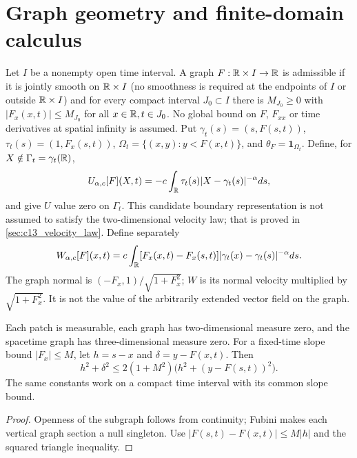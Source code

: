 \section{Graph geometry and finite-domain calculus}

\begin{definition}
  \label{def:c13_graph_data}
  Let $I$ be a nonempty open time interval. A graph $F:\mathbb{R}\times I\to\mathbb{R}$ is admissible if
  it is jointly smooth on $\mathbb{R}\times I$ (no smoothness is required at the endpoints of $I$ or outside $\mathbb{R}\times I$)
  and for every compact interval $J_0\subset I$ there is $M_{J_0}\ge0$
  with $|F_x(x,t)|\le M_{J_0}$ for all $x\in\mathbb{R},t\in J_0$.
  No global bound on $F$, $F_{xx}$ or time derivatives at spatial infinity is assumed.
  Put $\gamma_t(s)=(s,F(s,t))$, $\tau_t(s)=(1,F_x(s,t))$,
  $\Omega_t=\{(x,y):y<F(x,t)\}$, and $\theta_F=\mathbf1_{\Omega_t}$.
  Define, for $X\notin\Gamma_t=\gamma_t(\mathbb{R})$,
  \[
    U_{\alpha,c}[F](X,t)=-c\int_{\mathbb{R}}\tau_t(s)|X-\gamma_t(s)|^{-\alpha}ds,
  \]
  and give $U$ value zero on $\Gamma_t$. This candidate boundary representation is not assumed
  to satisfy the two-dimensional velocity law; that is proved in \cref{sec:c13_velocity_law}.
  Define separately
  \[
    W_{\alpha,c}[F](x,t)=c\int_{\mathbb{R}}
       [F_x(x,t)-F_x(s,t)]|\gamma_t(x)-\gamma_t(s)|^{-\alpha}ds.
  \]
  The graph normal is $(-F_x,1)/\sqrt{1+F_x^2}$; $W$ is its normal velocity multiplied by
  $\sqrt{1+F_x^2}$. It is not the value of the arbitrarily extended vector field on the graph.
\end{definition}

\begin{lemma}
  \label{lem:c13_graph_geometry}
  Each patch is measurable, each graph has two-dimensional measure zero, and the spacetime graph
  has three-dimensional measure zero. For a fixed-time slope bound $|F_x|\le M$, let
  $h=s-x$ and $\delta=y-F(x,t)$. Then
  \[
    h^2+\delta^2\le2(1+M^2)\bigl(h^2+(y-F(s,t))^2\bigr).
  \]
  The same constants work on a compact time interval with its common slope bound.
\end{lemma}
\begin{proof}
  Openness of the subgraph follows from continuity; Fubini makes each vertical graph section a
  null singleton. Use $|F(s,t)-F(x,t)|\le M|h|$ and the squared triangle inequality.
\end{proof}

